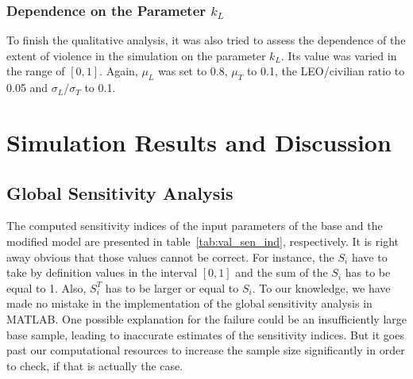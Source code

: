 \documentclass[11pt]{article}
\begin{document}
\subsubsection{Dependence on the Parameter $k_L$}
To finish the qualitative analysis, it was also tried to assess the dependence of the extent of violence in the simulation on the parameter $k_L$. Its value was varied in the range of $[0,1]$. Again, $\mu_L$ was set to 0.8, $\mu_T$ to 0.1, the LEO/civilian ratio to 0.05 and $\sigma_L$/$\sigma_T$ to 0.1.

\section{Simulation Results and Discussion}

\subsection{Global Sensitivity Analysis}
The computed sensitivity indices of the input parameters of the base and the modified model are presented in table~\ref{tab:val_sen_ind}, respectively. It is right away obvious that those values cannot be correct. For instance, the $S_i$ have to take by definition values in the interval $[0,1]$ and the sum of the $S_i$ has to be equal to 1. Also, $S_i^T$ has to be larger or equal to $S_i$. To our knowledge, we have made no mistake in the implementation of the global sensitivity analysis in MATLAB. One possible explanation for the failure could be an insufficiently large base sample, leading to inaccurate estimates of the sensitivity indices. But it goes past our computational resources to increase the sample size significantly in order to check, if that is actually the case.
\end{document}
